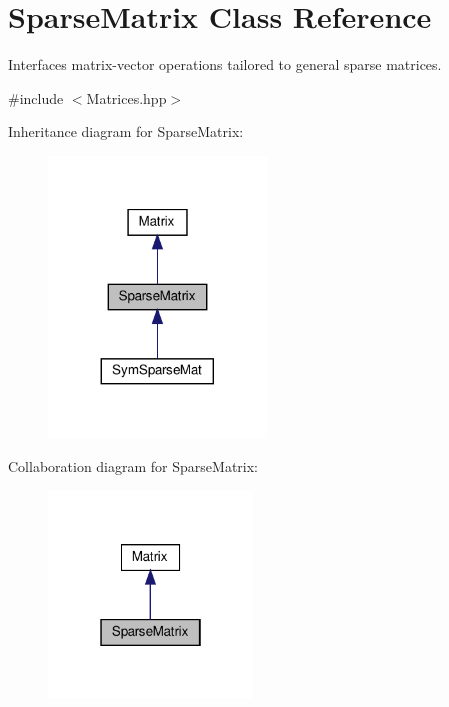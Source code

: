 \hypertarget{class_sparse_matrix}{}\section{Sparse\+Matrix Class Reference}
\label{class_sparse_matrix}


Interfaces matrix-\/vector operations tailored to general sparse matrices.  




{\ttfamily \#include $<$Matrices.\+hpp$>$}



Inheritance diagram for Sparse\+Matrix\+:
\nopagebreak
\begin{figure}[H]
\begin{center}
\leavevmode
\includegraphics[width=164pt]{class_sparse_matrix__inherit__graph}
\end{center}
\end{figure}


Collaboration diagram for Sparse\+Matrix\+:
\nopagebreak
\begin{figure}[H]
\begin{center}
\leavevmode
\includegraphics[width=154pt]{class_sparse_matrix__coll__graph}
\end{center}
\end{figure}
